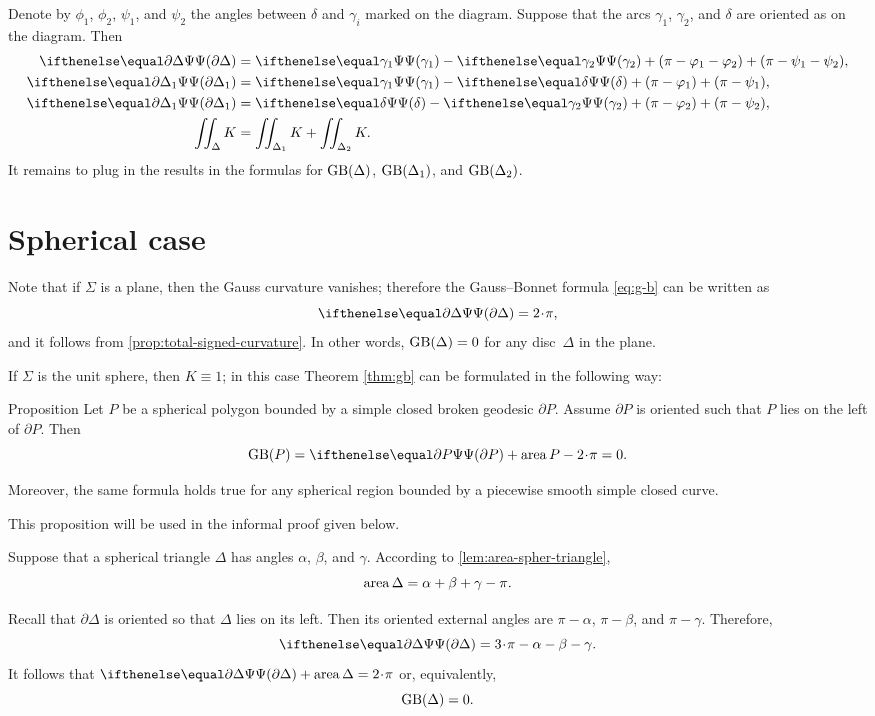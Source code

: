 Denote by $\phi_1$, $\phi_2$, $\psi_1$, and $\psi_2$ the angles between $\delta$ and $\gamma_i$ marked on the diagram.
Suppose that the arcs $\gamma_1$, $\gamma_2$, and $\delta$ are oriented as on the diagram. 
Then
\begin{align*}
\tgc{\partial \Delta}&= \tgc{\gamma_1}-\tgc{\gamma_2}+(\pi-\phi_1-\phi_2)+(\pi-\psi_1-\psi_2),
\\
\tgc{\partial \Delta_1}&= \tgc{\gamma_1}-\tgc\delta+(\pi-\phi_1)+(\pi-\psi_1),
\\
\tgc{\partial \Delta_1}&= \tgc\delta-\tgc{\gamma_2}+(\pi-\phi_2)+(\pi-\psi_2),
\\
\iint_\Delta K&=\iint_{\Delta_1} K+\iint_{\Delta_2} K.
\end{align*}
It remains to plug in the results in the formulas for $\mathop{\rm GB}\nolimits(\Delta)$, $\mathop{\rm GB}\nolimits(\Delta_1)$, and $\mathop{\rm GB}\nolimits(\Delta_2)$.
\qeds

\section{Spherical case}

Note that if $\Sigma$ is a plane, then the Gauss curvature vanishes;
therefore the Gauss--Bonnet formula \ref{eq:g-b} can be written as 
\[\tgc{\partial\Delta}=2\cdot \pi,\]
and it follows from \ref{prop:total-signed-curvature}.
In other words, $\mathop{\rm GB}\nolimits(\Delta)=0$ for any disc~$\Delta$ in the plane.

If $\Sigma$ is the unit sphere, then $K\equiv1$;
in this case Theorem \ref{thm:gb} can be formulated in the following way:

\begin{thm}{Proposition}\label{prop:area-of-spher-polygon}
Let $P$ be a spherical polygon bounded by a simple closed broken geodesic $\partial P$.
Assume $\partial P$ is oriented such that $P$ lies on the left of $\partial P$.
Then 
\[\GB(P)=\tgc{\partial P}+\area P-2\cdot \pi=0.\]

Moreover, the same formula holds true for any spherical region bounded by a piecewise smooth simple closed curve.
\end{thm}

This proposition will be used in the informal proof given below.

Suppose that a spherical triangle $\Delta$ has angles 
$\alpha$, $\beta$, and $\gamma$.
According to \ref{lem:area-spher-triangle},
\[\mathop{\rm area}\nolimits\Delta=\alpha+\beta+\gamma-\pi.\]

Recall that $\partial\Delta$ is oriented so that $\Delta$ lies on its left. 
Then its oriented external angles are  $\pi-\alpha$, $\pi-\beta$, and $\pi-\gamma$.
Therefore,
\[\tgc{\partial\Delta}=3\cdot\pi-\alpha-\beta-\gamma.\]
It follows that $\tgc{\partial\Delta}+\area \Delta=2\cdot\pi$ or, equivalently,
\[\mathop{\rm GB}\nolimits(\Delta)=0.\]
 
